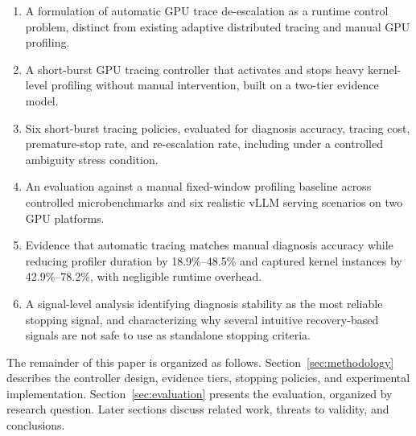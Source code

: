 \begin{enumerate}
  \item A formulation of automatic GPU trace de-escalation as a runtime control problem,
        distinct from existing adaptive distributed tracing and manual GPU profiling.
  \item A short-burst GPU tracing controller that activates and stops heavy kernel-level
        profiling without manual intervention, built on a two-tier evidence model.
  \item Six short-burst tracing policies, evaluated for diagnosis accuracy, tracing cost,
        premature-stop rate, and re-escalation rate, including under a controlled ambiguity
        stress condition.
  \item An evaluation against a manual fixed-window profiling baseline across controlled
        microbenchmarks and six realistic vLLM serving scenarios on two GPU platforms.
  \item Evidence that automatic tracing matches manual diagnosis accuracy while reducing
        profiler duration by 18.9\%--48.5\% and captured kernel instances by
        42.9\%--78.2\%, with negligible runtime overhead.
  \item A signal-level analysis identifying diagnosis stability as the most reliable stopping
        signal, and characterizing why several intuitive recovery-based signals are not safe
        to use as standalone stopping criteria.
\end{enumerate}

The remainder of this paper is organized as follows.
Section~\ref{sec:methodology} describes the controller design, evidence tiers, stopping
policies, and experimental implementation.
Section~\ref{sec:evaluation} presents the evaluation, organized by research question.
Later sections discuss related work, threats to validity, and conclusions.

